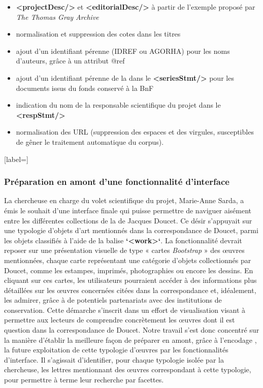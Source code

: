 \begin{itemize}[label=\textbullet]
    \item \textbf{<projectDesc/>} et \textbf{<editorialDesc/>} à partir de l’exemple proposé par \textit{The Thomas Gray Archive}
    \item normalisation et suppression des cotes dans les titres
    \item ajout d’un identifiant pérenne (IDREF ou AGORHA) pour les noms d’auteurs, grâce à un attribut @ref
    \item ajout d’un identifiant pérenne \ark de la \bnf dans le \textbf{<seriesStmt/>} pour les documents issus du fonds conservé à la BnF
    \item indication du nom de la responsable scientifique du projet dans le \textbf{<respStmt/>}
    \item normalisation des URL (suppression des espaces et des virgules, susceptibles de gêner le traitement automatique du corpus). 
\end{itemize}[label=\textbullet]

\subsubsection{Préparation en amont d’une fonctionnalité d’interface}

La chercheuse en charge du volet scientifique du projet, Marie-Anne Sarda, a émis le souhait d’une interface finale qui puisse permettre de naviguer aisément entre les différentes collections de la \baa de Jacques Doucet. 
Ce désir s'appuyait sur une typologie d'objets d'art mentionnés dans la correspondance de Doucet, parmi les objets classifiés à l'aide de la balise \textbf{`<work>`}. La fonctionnalité  devrait reposer sur une présentation visuelle de type « cartes \textit{Bootstrap} » des œuvres mentionnées, chaque carte représentant une catégorie d'objets collectionnés par Doucet, comme les estampes, imprimés, photographies ou encore les dessins. En cliquant sur ces cartes, les utilisateurs pourraient accéder à des informations plus détaillées sur les œuvres concernées citées dans la correspondance et, idéalement, les admirer, grâce à de potentiels partenariats avec des institutions de conservation. Cette démarche s'inscrit dans un effort de visualisation visant à permettre aux lecteurs de comprendre concrètement les œuvres dont il est question dans la correspondance de Doucet. Notre travail s’est donc concentré sur la manière d’établir la meilleure façon de préparer en amont, grâce à l’encodage \tei, la future exploitation de cette typologie d’œuvres par les fonctionnalités d’interface. Il s’agissait d’identifier, pour chaque typologie isolée par la chercheuse, les lettres mentionnant des œuvres correspondant à cette typologie, pour permettre à terme leur recherche par facettes.

